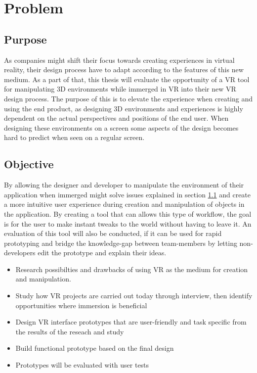\section{Problem}

\subsection{Purpose}
\label{intro:purpose}
As companies might shift their focus towards creating experiences in virtual reality, their design process have to adapt according to the features of this new medium. As a part of that, this thesis will evaluate the opportunity of a VR tool for manipulating 3D environments while immerged in VR into their new VR design process. The purpose of this is to elevate the experience when creating and using the end product, as designing 3D environments and experiences is highly dependent on the actual perspectives and positions of the end user. When designing these environments on a screen some aspects of the design becomes hard to predict when seen on a regular screen.

\subsection{Objective}
By allowing the designer and developer to manipulate the environment of their application when immerged might solve issues explained in section \ref{intro:purpose} and create a more intuitive user experience during creation and manipulation of objects in the application. By creating a tool that can allows this type of workflow, the goal is for the user to make instant tweaks to the world without having to leave it. An evaluation of this tool will also be conducted, if it can be used for rapid prototyping and bridge the knowledge-gap between team-members by letting non-developers edit the prototype and explain their ideas.


\begin{itemize}
	\item Research possibilties and drawbacks of using VR as the medium for creation and manipulation.
	\item Study how VR projects are carried out today through interview, then identify opportunities where immersion is beneficial
	\item Design VR interface prototypes that are user-friendly and task specific from the results of the reseach and study
	\item Build functional prototype based on the final design
	\item Prototypes will be evaluated with user tests
\end{itemize}

